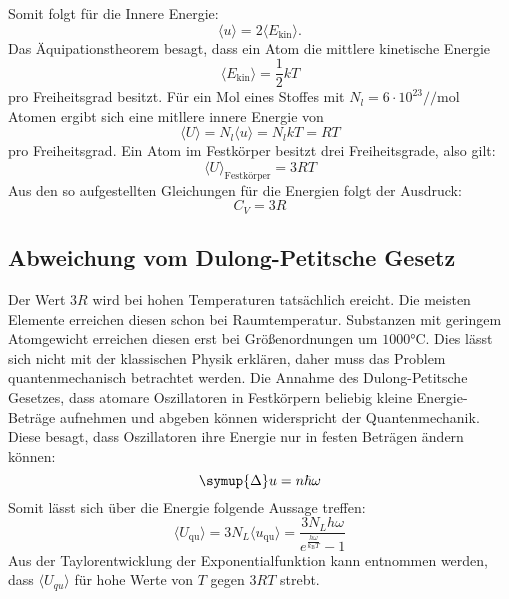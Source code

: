 Somit folgt für die Innere Energie:
\begin{equation}
  \langle u \rangle = 2 \langle E_\text{kin} \rangle .
\end{equation}
Das Äquipationstheorem besagt, dass ein Atom die mittlere kinetische Energie
\begin{equation}
  \langle E_\text{kin} \rangle = \frac{1}{2}kT
\end{equation}
pro Freiheitsgrad besitzt.
Für ein Mol eines Stoffes mit $N_l=6 \cdot 10^23/\si{\per\mol}$\cite{v201} Atomen ergibt sich eine mitllere innere Energie von
\begin{equation}
  \langle U \rangle = N_l \langle u \rangle = N_l k T = R T
\end{equation}
pro Freiheitsgrad.
Ein Atom im Festkörper besitzt drei Freiheitsgrade, also gilt:
\begin{equation}
  \langle U \rangle _\text{Festkörper}= 3 R T
\end{equation}
Aus den so aufgestellten Gleichungen für die Energien folgt der Ausdruck:
\begin{equation}
\label{eqn:peitsche}
C_V = 3R
\end{equation}
\subsection{Abweichung vom Dulong-Petitsche Gesetz}
Der Wert $3R$ wird bei hohen Temperaturen tatsächlich ereicht.
Die meisten Elemente erreichen diesen schon bei Raumtemperatur.
Substanzen mit geringem Atomgewicht erreichen diesen erst bei
Größenordnungen um $1000\si{\celsius}$.
Dies lässt sich nicht mit der klassischen Physik erklären,
daher muss das Problem quantenmechanisch betrachtet werden.
Die Annahme des Dulong-Petitsche Gesetzes, dass atomare Oszillatoren in Festkörpern
beliebig kleine Energie-Beträge aufnehmen und abgeben können widerspricht der Quantenmechanik.
Diese besagt, dass Oszillatoren ihre Energie nur in festen Beträgen ändern können:
\begin{equation}
\symup{\Delta} u = n \hbar \omega
\end{equation}
Somit lässt sich über die Energie folgende Aussage treffen:
\begin{equation}
\langle U_\text{qu} \rangle = 3 N_L \langle u_\text{qu} \rangle = \frac{3 N_L h
\omega}{e^{\frac{h\omega}{k_\text{B}T}}-1}
\end{equation}
Aus der Taylorentwicklung der Exponentialfunktion kann entnommen werden,
dass $\langle U_{qu} \rangle$ für hohe Werte von $T$ gegen $3RT$ strebt.
